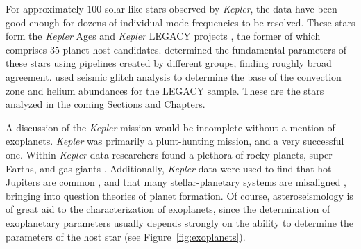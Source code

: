 For approximately $100$ solar-like stars observed by \emph{Kepler}, the data have been good enough for dozens of individual mode frequencies to be resolved. 
These stars form the \emph{Kepler} Ages \citep{2016MNRAS.456.2183D} and \emph{Kepler} LEGACY projects \citep{2017ApJ...835..172L}, the former of which comprises $35$ planet-host candidates. 
\citet{2015MNRAS.452.2127S, 2017ApJ...835..173S} determined the fundamental parameters of these stars using pipelines created by different groups, finding roughly broad agreement. 
\citet{2014ApJ...790..138V, 2017ApJ...837...47V} used seismic glitch analysis to determine the base of the convection zone and helium abundances for the LEGACY sample.
These are the stars analyzed in the coming Sections and Chapters.  





A discussion of the \emph{Kepler} mission would be incomplete without a mention of exoplanets. 
\emph{Kepler} was primarily a plunt-hunting mission, and a very successful one. 
Within \emph{Kepler} data researchers found a plethora of rocky planets, super Earths, and gas giants \citep[e.g.,][]{2008ApJ...680.1450P, 2011ApJ...729...27B, 2012ApJ...745..120B, 2014ApJS..210...20M}. 
Additionally, \emph{Kepler} data were used to find that hot Jupiters are common \citep{2008ApJ...680.1450P}, and that many stellar-planetary systems are misaligned \citep{2013Sci...342..331H}, bringing into question theories of planet formation. 
Of course, asteroseismology is of great aid to the characterization of exoplanets, since the determination of exoplanetary parameters usually depends strongly on the ability to determine the parameters of the host star (see Figure~\ref{fig:exoplanets}). 


